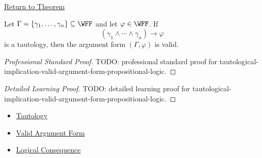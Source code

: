 \newpage
{}
\label{prf:tautological-implication-valid-argument-form-propositional-logic}

\begin{remark*}[Return]
\hyperref[thm:tautological-implication-valid-argument-form-propositional-logic]{Return to Theorem}
\end{remark*}

\begin{theorem*}
Let \(\Gamma=\{\gamma_1,\ldots,\gamma_n\}\subseteq\WFF\) and let
\(\varphi\in\WFF\). If
\[
(\gamma_1\land\cdots\land\gamma_n)\to\varphi
\]
is a tautology, then the argument form \((\Gamma,\varphi)\) is valid.
\end{theorem*}

\begin{proof}[Professional Standard Proof]
\LRAProofBodyStart
TODO: professional standard proof for tautological-implication-valid-argument-form-propositional-logic.
\end{proof}

\begin{proof}[Detailed Learning Proof]
\LRAProofBodyStart
TODO: detailed learning proof for tautological-implication-valid-argument-form-propositional-logic.
\end{proof}

\begin{remark*}
\end{remark*}

\begin{dependencies}
\begin{itemize}
  \item \hyperref[def:tautology-propositional-logic]{Tautology}
  \item \hyperref[def:valid-argument-form-propositional-logic]{Valid Argument Form}
  \item \hyperref[def:logical-consequence-propositional-logic]{Logical Consequence}
\end{itemize}
\end{dependencies}

\clearpage
